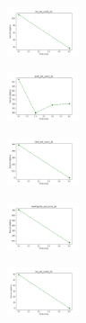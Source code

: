 \begin{figure}[H]
    \centering
    \begin{subfigure}
        \centering
        \includegraphics[width=0.234\textwidth]{img/copkm/iris_set_const_20_949004259_cost.png}
    \end{subfigure}
    \hfill
    \begin{subfigure}
        \centering
        \includegraphics[width=0.234\textwidth]{img/copkm/ecoli_set_const_20_949004259_cost.png}
    \end{subfigure}
    \hfill
    \begin{subfigure}
        \centering
        \includegraphics[width=0.234\textwidth]{img/copkm/rand_set_const_20_949004259_cost.png}
    \end{subfigure}
    \hfill
    \begin{subfigure}
        \centering
        \includegraphics[width=0.234\textwidth]{img/copkm/newthyroid_set_const_20_949004259_cost.png}
    \end{subfigure}
    \hfill
    \begin{subfigure}
        \centering
        \includegraphics[width=0.234\textwidth]{img/copkm/iris_set_const_20_589741062_cost.png}
    \end{subfigure}
    \hfill

\end{figure}
